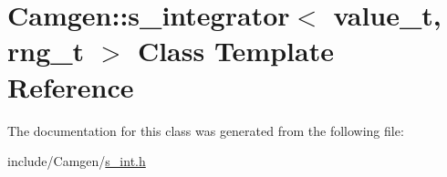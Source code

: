 \hypertarget{a00483}{\section{Camgen\-:\-:s\-\_\-integrator$<$ value\-\_\-t, rng\-\_\-t $>$ Class Template Reference}
\label{a00483}
}


The documentation for this class was generated from the following file\-:\begin{DoxyCompactItemize}
\item 
include/\-Camgen/\hyperlink{a00736}{s\-\_\-int.\-h}\end{DoxyCompactItemize}
